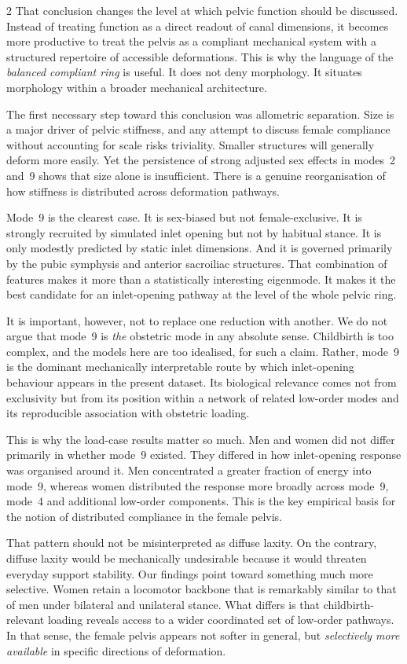 \documentclass[openacc]{rsproca_new}
\begin{document}
\begin{multicols}{2}
That conclusion changes the level at which pelvic function should be discussed. Instead of treating function as a direct readout of canal dimensions, it becomes more productive to treat the pelvis as a compliant mechanical system with a structured repertoire of accessible deformations. This is why the language of the \emph{balanced compliant ring} is useful. It does not deny morphology. It situates morphology within a broader mechanical architecture.

The first necessary step toward this conclusion was allometric separation. Size is a major driver of pelvic stiffness, and any attempt to discuss female compliance without accounting for scale risks triviality. Smaller structures will generally deform more easily. Yet the persistence of strong adjusted sex effects in modes~2 and~9 shows that size alone is insufficient. There is a genuine reorganisation of how stiffness is distributed across deformation pathways.

Mode~9 is the clearest case. It is sex-biased but not female-exclusive. It is strongly recruited by simulated inlet opening but not by habitual stance. It is only modestly predicted by static inlet dimensions. And it is governed primarily by the pubic symphysis and anterior sacroiliac structures. That combination of features makes it more than a statistically interesting eigenmode. It makes it the best candidate for an inlet-opening pathway at the level of the whole pelvic ring.

It is important, however, not to replace one reduction with another. We do not argue that mode~9 is \emph{the} obstetric mode in any absolute sense. Childbirth is too complex, and the models here are too idealised, for such a claim. Rather, mode~9 is the dominant mechanically interpretable route by which inlet-opening behaviour appears in the present dataset. Its biological relevance comes not from exclusivity but from its position within a network of related low-order modes and its reproducible association with obstetric loading.

This is why the load-case results matter so much. Men and women did not differ primarily in whether mode~9 existed. They differed in how inlet-opening response was organised around it. Men concentrated a greater fraction of energy into mode~9, whereas women distributed the response more broadly across mode~9, mode~4 and additional low-order components. This is the key empirical basis for the notion of distributed compliance in the female pelvis.

That pattern should not be misinterpreted as diffuse laxity. On the contrary, diffuse laxity would be mechanically undesirable because it would threaten everyday support stability. Our findings point toward something much more selective. Women retain a locomotor backbone that is remarkably similar to that of men under bilateral and unilateral stance. What differs is that childbirth-relevant loading reveals access to a wider coordinated set of low-order pathways. In that sense, the female pelvis appears not softer in general, but \emph{selectively more available} in specific directions of deformation.


\end{multicols}
\end{document}
